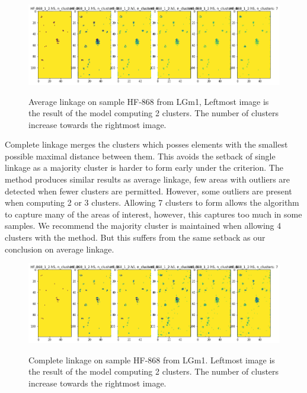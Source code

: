 \begin{figure}[H]

    \centering
{\includegraphics[width=15cm]{images/Average_linkage/LGm-1/HF-868_1_2.h5_0.png} }
\caption{Average linkage on sample HF-868 from LGm1, Leftmost image is the result of the model computing 2 clusters. The number of clusters increase towards the rightmost image.\label{fig:AL_HF868}}%

\end{figure}

Complete linkage merges the clusters which posses elements with the smallest possible maximal distance between them. This avoids the setback of single linkage as a majority cluster is harder to form early under the criterion. The method produces similar results as average linkage, few areas with outliers are detected when fewer clusters are permitted. However, some outliers are present when computing 2 or 3 clusters. Allowing 7 clusters to form allows the algorithm to capture many of the areas of interest, however, this captures too much in some samples. We recommend the majority cluster is maintained when allowing 4 clusters with the method. But this suffers from the same setback as our conclusion on average linkage.

\begin{figure}[H]

    \centering
{\includegraphics[width=15cm]{images/Complete_linkage/LGm-1/HF-868_1_2.h5_0.png} }
\caption{Complete linkage on sample HF-868 from LGm1. Leftmost image is the result of the model computing 2 clusters. The number of clusters increase towards the rightmost image.\label{fig:SL_HF868}}%

\end{figure}

